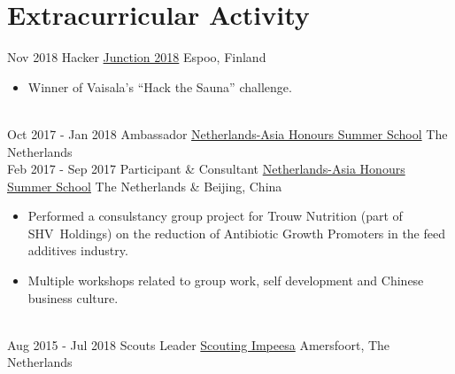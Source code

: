 \documentclass[a4paper]{twentysecondcv} %
\begin{document}

\section{Extracurricular Activity}
\begin{twenty} %
	\twentyitem
	{Nov 2018}
	{}
	{Hacker}
	{\href{https://2018.hackjunction.com/}{Junction 2018}}
	{Espoo, Finland}
	{
	\begin{itemize}
			\item Winner of Vaisala's ``Hack the Sauna'' challenge.
	\end{itemize}
	}
	\\
	\twentyitem
	{Oct 2017 -}
	{Jan 2018}
	{Ambassador}
	{\href{https://nahss.nl}{Netherlands-Asia Honours Summer School}}
	{The Netherlands}
	{}
	\\
	\twentyitem
	{Feb 2017 -}
	{Sep 2017}
	{Participant \& Consultant}
	{\href{https://nahss.nl}{Netherlands-Asia Honours Summer School}}
	{The Netherlands \& Beijing, China}
	{
		\begin{itemize}
			\item Performed a consulstancy group project for Trouw Nutrition (part of SHV~Holdings) on the reduction of Antibiotic Growth Promoters in the feed additives industry.
			\item Multiple workshops related to group work, self development and Chinese business culture.
		\end{itemize}
	}
	\\
	\twentyitem
	{Aug 2015 -}
	{Jul 2018}
	{Scouts Leader}
	{\href{http://impeesa.nl/}{Scouting Impeesa}}
	{Amersfoort, The Netherlands}
	{}
	\\
\end{twenty}
\end{document}
